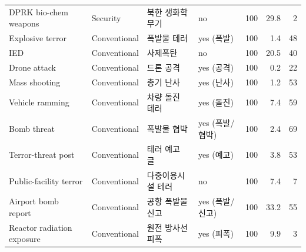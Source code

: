 \documentclass[11pt]{article}
\begin{document}
{\begin{tabular}{llllrrr}
DPRK bio-chem weapons & Security & 북한 생화학무기 & no & 100 & 29.8 & 2 \\
Explosive terror & Conventional & 폭발물 테러 & yes (폭발) & 100 & 1.4 & 48 \\
IED & Conventional & 사제폭탄 & no & 100 & 20.5 & 40 \\
Drone attack & Conventional & 드론 공격 & yes (공격) & 100 & 0.2 & 22 \\
Mass shooting & Conventional & 총기 난사 & yes (난사) & 100 & 1.2 & 53 \\
Vehicle ramming & Conventional & 차량 돌진 테러 & yes (돌진) & 100 & 7.4 & 59 \\
Bomb threat & Conventional & 폭발물 협박 & yes (폭발/협박) & 100 & 2.4 & 69 \\
Terror-threat post & Conventional & 테러 예고 글 & yes (예고) & 100 & 3.8 & 53 \\
Public-facility terror & Conventional & 다중이용시설 테러 & no & 100 & 7.4 & 7 \\
Airport bomb report & Conventional & 공항 폭발물 신고 & yes (폭발/신고) & 100 & 33.2 & 55 \\
Reactor radiation exposure & Conventional & 원전 방사선 피폭 & yes (피폭) & 100 & 9.9 & 3 \\
\bottomrule\end{tabular}}
\end{document}
